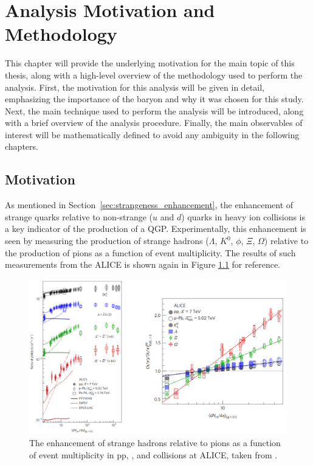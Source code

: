 \chapter{Analysis Motivation and Methodology}
\label{ch:analysis_mnm}

This chapter will provide the underlying motivation for the main topic of this thesis, along with a high-level overview of the methodology used to perform the analysis. First, the motivation for this analysis will be given in detail, emphasizing the importance of the \lmb baryon and why it was chosen for this study. Next, the main technique used to perform the analysis will be introduced, along with a brief overview of the analysis procedure. Finally, the main observables of interest will be mathematically defined to avoid any ambiguity in the following chapters.

\section{Motivation}
As mentioned in Section~\ref{sec:strangeness_enhancement}, the enhancement of strange quarks relative to non-strange ($u$ and $d$) quarks in heavy ion collisions is a key indicator of the production of a QGP. Experimentally, this enhancement is seen by measuring the production of strange hadrons ($\Lambda$, $K^0$, $\phi$, $\Xi$, $\Omega$) relative to the production of pions as a function of event multiplicity. The results of such measurements from the ALICE is shown again in Figure \ref{fig:ref_enhancement} for reference. 

\begin{figure}
\centering
\includegraphics[width=\textwidth]{figures/introduction/strangeness_enhancement.png}
\caption{The enhancement of strange hadrons relative to pions as a function of event multiplicity in pp, \pPb, and \PbPb collisions at ALICE, taken from \cite{NATURE}.}
\label{fig:ref_enhancement}
\end{figure}

